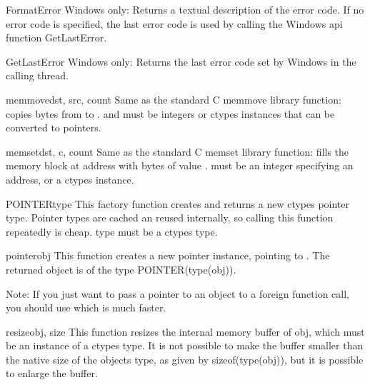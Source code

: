 \begin{funcdesc}{FormatError}{}
Windows only: Returns a textual description of the error code. If
no error code is specified, the last error code is used by calling
the Windows api function GetLastError.
\end{funcdesc}

\begin{funcdesc}{GetLastError}{}
Windows only: Returns the last error code set by Windows in the
calling thread.
\end{funcdesc}

\begin{funcdesc}{memmove}{dst, src, count}
Same as the standard C memmove library function: copies 
bytes from  to .  and  must be
integers or ctypes instances that can be converted to pointers.
\end{funcdesc}

\begin{funcdesc}{memset}{dst, c, count}
Same as the standard C memset library function: fills the memory
block at address  with  bytes of value
.  must be an integer specifying an address, or a
ctypes instance.
\end{funcdesc}

\begin{funcdesc}{POINTER}{type}
This factory function creates and returns a new ctypes pointer
type. Pointer types are cached an reused internally, so calling
this function repeatedly is cheap. type must be a ctypes type.
\end{funcdesc}

\begin{funcdesc}{pointer}{obj}
This function creates a new pointer instance, pointing to
. The returned object is of the type POINTER(type(obj)).

Note: If you just want to pass a pointer to an object to a foreign
function call, you should use  which is much faster.
\end{funcdesc}

\begin{funcdesc}{resize}{obj, size}
This function resizes the internal memory buffer of obj, which
must be an instance of a ctypes type. It is not possible to make
the buffer smaller than the native size of the objects type, as
given by sizeof(type(obj)), but it is possible to enlarge the
buffer.
\end{funcdesc}

